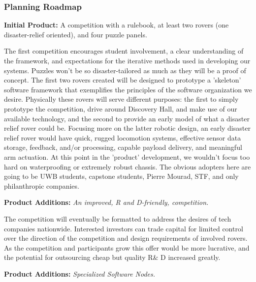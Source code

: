 \documentclass[a4paper, 10pt]{article}
\begin{document}
		\subsubsection{Planning Roadmap}
		\textbf{Initial Product:} A competition with a rulebook, at least two rovers (one disaster-relief oriented), and four puzzle panels.
		
		The first competition encourages student involvement, a clear understanding of the framework, and expectations for the iterative methods used in developing our systems. Puzzles won't be so disaster-tailored as much as they will be a proof of concept. The first two rovers created will be designed to prototype a 'skeleton' software framework that exemplifies the principles of the software organization we desire. Physically these rovers will serve different purposes: the first to simply prototype the competition, drive around Discovery Hall, and make use of our available technology, and the second to provide an early model of what a disaster relief rover could be. Focusing more on the latter robotic design, an early disaster relief rover would have quick, rugged locomotion systems, effective sensor data storage, feedback, and/or processing, capable payload delivery, and meaningful arm actuation. At this point in the 'product' development, we wouldn't focus too hard on waterproofing or extremely robust chassis. The obvious adopters here are going to be UWB students, capstone students, Pierre Mourad, STF, and only philanthropic companies.
		
		\textbf{Product Additions:} \emph{An improved, R and D-friendly, competition.}

	The competition will eventually be formatted to address the desires of tech companies nationwide. Interested investors can trade capital for limited control over the direction of the competition and design requirements of involved rovers. As the competition and participants grow this offer would be more lucrative, and the potential for outsourcing cheap but quality R\& D increased greatly.

		\textbf{Product Additions:} \emph{Specialized Software Nodes.}
		
\end{document}
